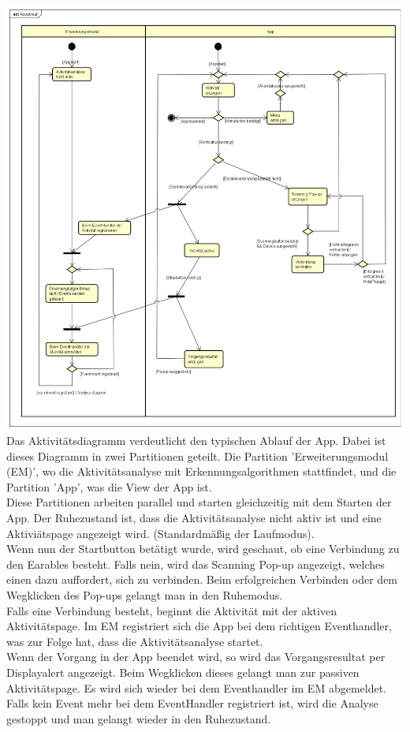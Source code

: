 \documentclass[a4paper,12pt]{article}
\begin{document}
\includegraphics[width=1.1\textwidth]{./Diagramme/Appablauf.png}\\
Das Aktivitätsdiagramm verdeutlicht den typischen Ablauf der App. Dabei ist dieses Diagramm in zwei Partitionen geteilt. Die Partition 'Erweiterungsmodul (EM)', wo die Aktivitätsanalyse mit Erkennungsalgorithmen stattfindet, und die  Partition 'App', was die View der App ist.\\
Diese Partitionen arbeiten parallel und starten gleichzeitig mit dem Starten der App. Der Ruhezustand ist, dass die Aktivitätsanalyse nicht aktiv ist und eine Aktiviätspage angezeigt wird. (Standardmäßig der Laufmodus).\\
Wenn nun der Startbutton betätigt wurde, wird geschaut, ob eine Verbindung zu den \Gls{Earables} besteht. Falls nein, wird das Scanning Pop-up angezeigt, welches einen dazu auffordert, sich zu verbinden.
Beim erfolgreichen Verbinden oder dem Wegklicken des Pop-ups gelangt man in den Ruhemodus.\\
Falls eine Verbindung besteht, beginnt die Aktivität mit der aktiven Aktivitätspage. Im EM registriert sich die App bei dem richtigen Eventhandler, was zur Folge hat, dass die Aktivitätsanalyse startet.\\
Wenn der Vorgang in der App beendet wird, so wird das Vorgangsresultat per Displayalert angezeigt. Beim Wegklicken dieses gelangt man zur passiven Aktivitätspage. Es wird sich wieder bei dem Eventhandler im EM abgemeldet.\\
Falls kein Event mehr bei dem EventHandler registriert ist, wird die Analyse gestoppt und man gelangt wieder in den Ruhezustand.\\
\newpage
\end{document}
